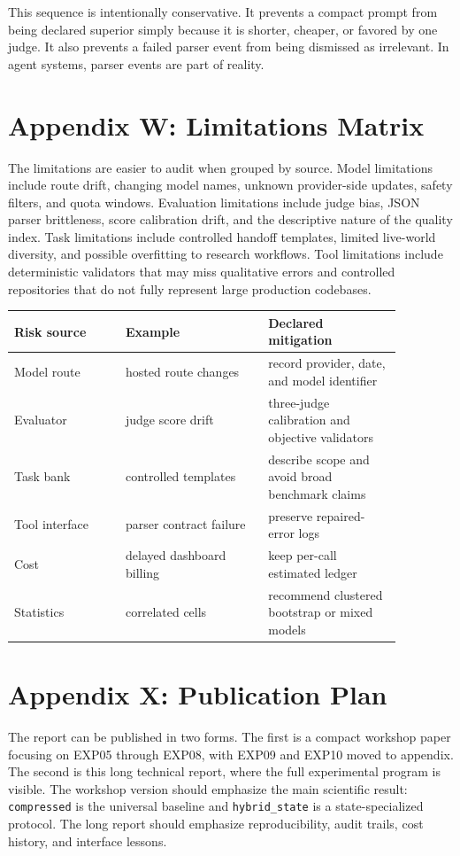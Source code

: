\documentclass[11pt]{article}
\begin{document}
This sequence is intentionally conservative. It prevents a compact prompt from being declared superior simply because it is shorter, cheaper, or favored by one judge. It also prevents a failed parser event from being dismissed as irrelevant. In agent systems, parser events are part of reality.

\clearpage
\section{Appendix W: Limitations Matrix}
The limitations are easier to audit when grouped by source. Model limitations include route drift, changing model names, unknown provider-side updates, safety filters, and quota windows. Evaluation limitations include judge bias, JSON parser brittleness, score calibration drift, and the descriptive nature of the quality index. Task limitations include controlled handoff templates, limited live-world diversity, and possible overfitting to research workflows. Tool limitations include deterministic validators that may miss qualitative errors and controlled repositories that do not fully represent large production codebases.

\begin{longtable}{p{0.25\linewidth}p{0.32\linewidth}p{0.30\linewidth}}
\toprule
Risk source & Example & Declared mitigation \\
\midrule
\endhead
Model route & hosted route changes & record provider, date, and model identifier \\
Evaluator & judge score drift & three-judge calibration and objective validators \\
Task bank & controlled templates & describe scope and avoid broad benchmark claims \\
Tool interface & parser contract failure & preserve repaired-error logs \\
Cost & delayed dashboard billing & keep per-call estimated ledger \\
Statistics & correlated cells & recommend clustered bootstrap or mixed models \\
\bottomrule
\end{longtable}

\clearpage
\section{Appendix X: Publication Plan}
The report can be published in two forms. The first is a compact workshop paper focusing on EXP05 through EXP08, with EXP09 and EXP10 moved to appendix. The second is this long technical report, where the full experimental program is visible. The workshop version should emphasize the main scientific result: \texttt{compressed} is the universal baseline and \texttt{hybrid\_state} is a state-specialized protocol. The long report should emphasize reproducibility, audit trails, cost history, and interface lessons.
\end{document}
